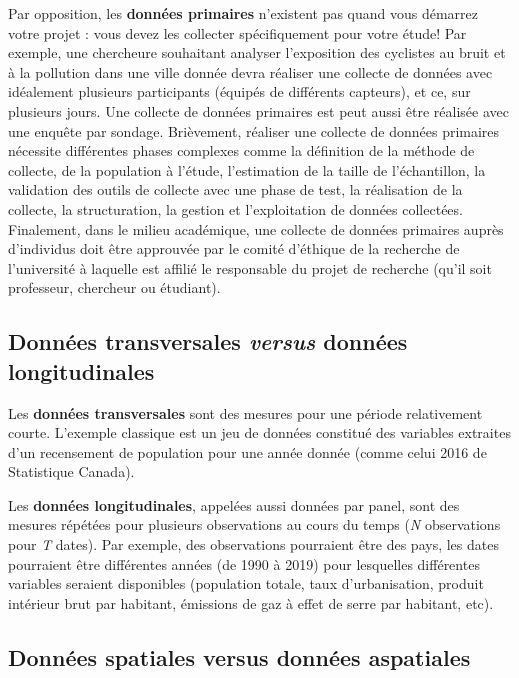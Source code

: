 \documentclass[
  11pt,
  french,
]{book}
\begin{document}
Par opposition, les \textbf{données primaires} n'existent pas quand vous démarrez votre projet : vous devez les collecter spécifiquement pour votre étude! Par exemple, une chercheure souhaitant analyser l'exposition des cyclistes au bruit et à la pollution dans une ville donnée devra réaliser une collecte de données avec idéalement plusieurs participants (équipés de différents capteurs), et ce, sur plusieurs jours.
Une collecte de données primaires est peut aussi être réalisée avec une enquête par sondage. Brièvement, réaliser une collecte de données primaires nécessite différentes phases complexes comme la définition de la méthode de collecte, de la population à l'étude, l'estimation de la taille de l'échantillon, la validation des outils de collecte avec une phase de test, la réalisation de la collecte, la structuration, la gestion et l'exploitation de données collectées. Finalement, dans le milieu académique, une collecte de données primaires auprès d'individus doit être approuvée par le comité d'éthique de la recherche de l'université à laquelle est affilié le responsable du projet de recherche (qu'il soit professeur, chercheur ou étudiant).

\hypertarget{sect0222}{%
\subsection{\texorpdfstring{Données transversales \emph{versus} données longitudinales}{Données transversales versus données longitudinales}}\label{sect0222}}

Les \textbf{données transversales} sont des mesures pour une période relativement courte. L'exemple classique est un jeu de données constitué des variables extraites d'un recensement de population pour une année donnée (comme celui 2016 de Statistique Canada).

Les \textbf{données longitudinales}, appelées aussi données par panel, sont des mesures répétées pour plusieurs observations au cours du temps (\emph{N} observations pour \emph{T} dates). Par exemple, des observations pourraient être des pays, les dates pourraient être différentes années (de 1990 à 2019) pour lesquelles différentes variables seraient disponibles (population totale, taux d'urbanisation, produit intérieur brut par habitant, émissions de gaz à effet de serre par habitant, etc).

\hypertarget{sect0223}{%
\subsection{Données spatiales versus données aspatiales}\label{sect0223}}
\end{document}

